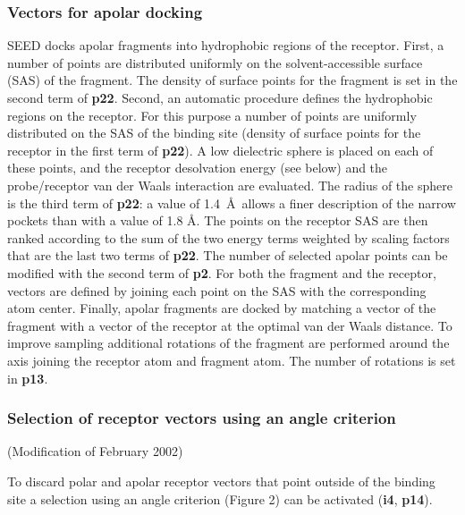 \documentclass[a4paper,12pt,titlepage]{article}
\begin{document}
\subsubsection{Vectors for apolar docking}

SEED docks apolar fragments into hydrophobic regions of the receptor. First, a number of points 
are distributed uniformly on the solvent-accessible surface (SAS) of the fragment. The density of 
surface points for the fragment is set in the second term 
of {\bf p22}. Second, an automatic procedure defines the hydrophobic regions on the 
receptor. For this purpose a number of points are uniformly distributed on the SAS of the binding site 
(density of surface points for the receptor in the first term of {\bf p22}). 
A low dielectric sphere is placed on each of these points, and the receptor desolvation energy 
(see below) and the probe/receptor van der Waals interaction are evaluated. The radius of the sphere 
is the third term of {\bf p22}: a value of 1.4~\AA \, allows a finer description of the narrow pockets 
than with a value of 1.8 \AA. The points on the receptor SAS are then ranked according to the sum of 
the two energy terms weighted by scaling factors that are the last two terms
of {\bf p22}. The number of selected apolar points can be modified with the second term of {\bf p2}. 
For both the fragment and the receptor, 
vectors are defined by joining each point on the SAS with the corresponding atom center. Finally, 
apolar fragments are docked by matching a vector of the fragment with a vector of the receptor at the 
optimal van der Waals distance. To improve sampling additional rotations of the fragment are performed 
around the axis joining the receptor atom and fragment atom. The number of rotations is set in 
{\bf p13}.

\subsubsection{Selection of receptor vectors using an angle criterion}
\label{sssec:select}

(Modification of February 2002)

\noindent
To discard polar and apolar receptor vectors that point outside of the binding site 
a selection using an angle criterion (Figure 2) can be activated ({\bf i4}, {\bf p14}). 
\end{document}
